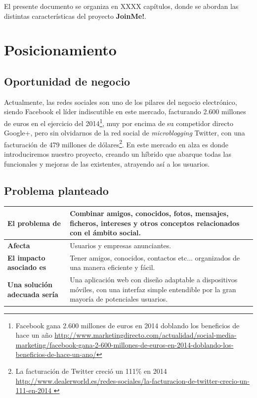 \documentclass[12pt, a4paper, titlepage]{article}
\begin{document}
El presente documento se organiza en XXXX capítulos, donde se abordan las distintas características del proyecto \textbf{JoinMe!}.


\section{Posicionamiento}

\subsection{Oportunidad de negocio}

Actualmente, las redes sociales son uno de los pilares del negocio electrónico, siendo Facebook el líder indiscutible en este mercado, facturando 2.600 millones de euros en el ejercicio del 2014\footnote{Facebook gana 2.600 millones de euros en 2014 doblando los beneficios de hace un año \url{http://www.marketingdirecto.com/actualidad/social-media-marketing/facebook-gana-2-600-millones-de-euros-en-2014-doblando-los-beneficios-de-hace-un-ano/}}, muy por encima de su competidor directo Google+, pero sin olvidarnos de la red social de \textit{microblogging} Twitter, con una facturación de 479 millones de dólares\footnote{ La facturación de Twitter creció un 111\% en 2014 \url{http://www.dealerworld.es/redes-sociales/la-facturacion-de-twitter-crecio-un-111-en-2014 }}. En este mercado en alza es donde introduciremos nuestro proyecto, creando un híbrido que abarque todas las funcionales y mejoras de las existentes, atrayendo así a los usuarios.


\subsection{Problema planteado}

\begin{center}
	\begin{tabular}{| p{7cm} | p{8cm} |}
 		\hline
		\textbf{El problema de} & Combinar amigos, conocidos, fotos, mensajes, ficheros, intereses y otros conceptos relacionados con el ámbito social.\\ \hline
		\textbf{Afecta} & Usuarios y empresas anunciantes. \\ \hline	
		\textbf{El impacto asociado es} & Tener amigos, conocidos, contactos etc... organizados de una manera eficiente y fácil.\\ \hline	
		\textbf{Una solución adecuada sería}	&  Una aplicación web con diseño adaptable a dispositivos móviles, con una interfaz simple entendible por la gran mayoría de potenciales usuarios. \\ \hline	    	\end{tabular}
\end{center}
\end{document}

